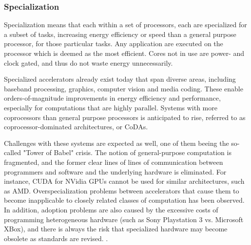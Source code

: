 
\subsubsection{Specialization}
Specialization means that each within a set of processors, each are specialized for a subset of tasks, increasing energy efficiency or speed than a general purpose processor, for those particular tasks.
Any application are executed on the processor which is deemed as the most efficient.
Cores not in use are power- and clock gated, and thus do not waste energy unnecessarily.

Specialized accelerators already exist today that span diverse areas, including baseband processing, graphics, computer vision and media coding.
These enable orders-of-magnitude improvements in energy efficiency and performance, especially for computations that are highly parallel.
Systems with more coprocessors than general purpose processors is anticipated to rise, referred to as coprocessor-dominated architectures, or CoDAs.

Challenges with these systems are expected as well, one of them beeing the so-called "Tower of Babel" crisis.
The notion of general-purpose computation is fragmented, and the former clear lines of lines of communication between programmers and software and the underlying hardware is eliminated.
For instance, CUDA for NVidia GPUs cannot be used for similar architectures, such as AMD.
Overspecialization problems between accelerators that cause them to become inapplicable to closely related classes of computation has been observed.
In addition, adoption problems are also caused by the excessive costs of programming heterogeneous hardware (such as Sony Playstation 3 vs. Microsoft XBox), and there is always the risk that specialized hardware may become obsolete as standards are revised. \cite{dark-silicon}.










